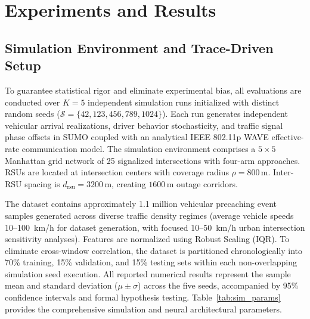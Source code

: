 \documentclass[journal]{IEEEtran}
\begin{document}
\section{Experiments and Results}\label{sec:experiments}

\subsection{Simulation Environment and Trace-Driven Setup}\label{sec:setup}
To guarantee statistical rigor and eliminate experimental bias, all evaluations are conducted over $K = 5$ independent simulation runs initialized with distinct random seeds ($\mathcal{S} = \{42, 123, 456, 789, 1024\}$). Each run generates independent vehicular arrival realizations, driver behavior stochasticity, and traffic signal phase offsets in SUMO coupled with an analytical IEEE 802.11p WAVE effective-rate communication model. The simulation environment comprises a $5 \times 5$ Manhattan grid network of 25 signalized intersections with four-arm approaches. RSUs are located at intersection centers with coverage radius $\rho = 800\,\text{m}$. Inter-RSU spacing is $d_{\text{rsu}} = 3200\,\text{m}$, creating $1600\,\text{m}$ outage corridors. 

The dataset contains approximately 1.1 million vehicular precaching event samples generated across diverse traffic density regimes (average vehicle speeds 10--100~km/h for dataset generation, with focused 10--50~km/h urban intersection sensitivity analyses). Features are normalized using Robust Scaling (IQR). To eliminate cross-window correlation, the dataset is partitioned chronologically into 70\% training, 15\% validation, and 15\% testing sets within each non-overlapping simulation seed execution. All reported numerical results represent the sample mean and standard deviation ($\mu \pm \sigma$) across the five seeds, accompanied by 95\% confidence intervals and formal hypothesis testing. Table~\ref{tab:sim_params} provides the comprehensive simulation and neural architectural parameters.
\end{document}

